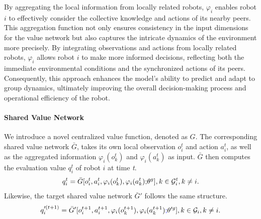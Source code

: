 \documentclass[lettersize,journal]{IEEEtran}
\newcommand{\blue}[1]{\textcolor{blue}{#1}}
\begin{document}
By aggregating the local information from locally related robots, $\varphi_{i}$ enables robot $i$ to effectively consider the collective knowledge and actions of its nearby peers. This aggregation function not only ensures consistency in the input dimensions for the value network but also captures the intricate dynamics of the environment more precisely. By integrating observations and actions from locally related robots, $\varphi_{i}$ allows robot $i$ to make more informed decisions, reflecting both the immediate environmental conditions and the synchronized actions of its peers. Consequently, this approach enhances the model's ability to predict and adapt to group dynamics, ultimately improving the overall decision-making process and operational efficiency of the robot.

\paragraph{\textbf{Shared Value Network}}
We introduce a novel centralized value function, denoted as ${G}$. The corresponding shared value network $\bar{G}$, takes its own local observation $o_{i}^{t}$ and action $a_{i}^{t}$, as well as the aggregated information $\varphi_{i}\left(o_{k}^{t}\right)$ and $\varphi_{i}\left(a_{k}^{t}\right)$ as input. $\bar{G}$ then computes the evaluation value $q_i^{t}$ of robot $i$ at time \textit{t}.
\begin{equation}                    
    q_i^{t}=\bar{G}[o_{i}^{t},a_{i}^{t},\varphi_{i}(o_{k}^{t}),\varphi_{i}(a_{k}^{t}) {;}\theta^{g}], k\in{\cal G}_{i}^{t},k\neq i.\label{eq17}
\end{equation}
Likewise, the target shared value network $\bar{G}'$ follows the same structure.
\begin{equation}            q_i'^{(t+1)}=\bar{G}'[o_i^{t+1},a_i^{t+1},\varphi_i(o_k^{t+1}),\varphi_i(a_k^{t+1})\blue{;}\theta'^{g}], k\in{\cal G}_{i},k\neq i.\label{eq18}
\end{equation}
\end{document}
